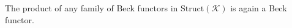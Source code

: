The product of any family of Beck functors in $\text{Struct}(\mathcal{K})$ is again a Beck functor.

